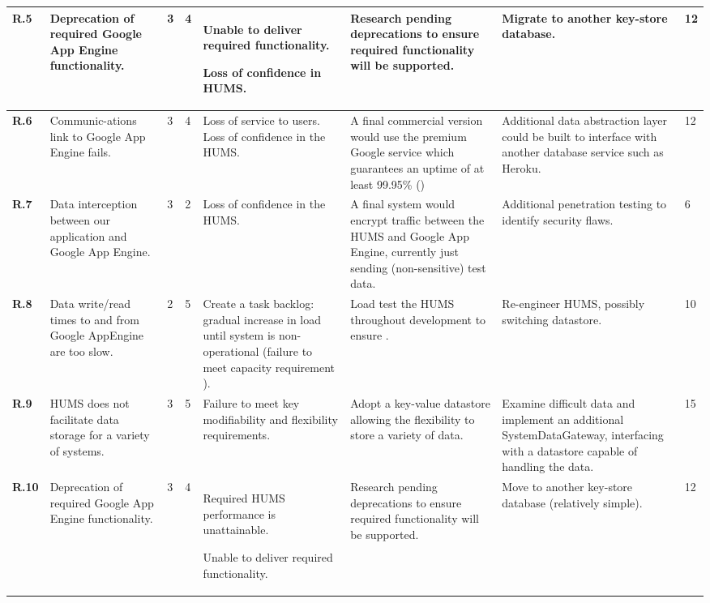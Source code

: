 \begin{longtable}[H]{| p{0.6cm} | p{2.2cm} | p{0.26cm} | p{0.26cm} | p{2.7cm} | p{3cm} | p{2.6cm} | p{0.4cm} |}
  \hline \textbf{R.5}
  & Deprecation of required Google App Engine functionality.
  & 3
  & 4

  & Unable to deliver required functionality.
  
  Loss of confidence in HUMS.
  & Research pending deprecations to ensure required functionality will be supported.
  & Migrate to another key-store database.
  & 12\\
  
  \hline \textbf{R.6}
  & Communic-ations link to Google App Engine fails.
  & 3
  & 4
  & Loss of service to users.
  Loss of confidence in the HUMS.
  & A final commercial version would use the premium Google service which guarantees an uptime of at least 99.95\% (\nfrit10)
  & Additional data abstraction layer could be built to interface with another database service such as Heroku.
  & 12\\
  
  \hline \textbf{R.7}
  & Data interception between our application and Google App Engine.
  & 3
  & 2
  & Loss of confidence in the HUMS.
  & A final system would encrypt traffic between the HUMS and Google App Engine, currently just sending (non-sensitive) test data.
  & Additional penetration testing to identify security flaws.
  & 6\\
  
  \hline \textbf{R.8}
  & Data write/read times to and from Google AppEngine are too slow.
  & 2
  & 5
  & Create a task backlog: gradual increase in load until system
  is non-operational (failure to meet capacity requirement \nfrit9).
  & Load test the HUMS throughout development to ensure \nfrit9.
  & Re-engineer HUMS, possibly switching datastore.
  & 10\\
  
  \hline \textbf{R.9}
  & HUMS does not facilitate data storage for a variety of systems.
  & 3
  & 5
  & Failure to meet key modifiability and flexibility requirements.
  & Adopt a key-value datastore allowing the flexibility to store a variety of data.
  & Examine difficult data and implement an additional SystemDataGateway,
  interfacing with a datastore capable of handling the data.
  & 15\\  
  
  \hline \textbf{R.10}
  & Deprecation of required Google App Engine functionality.
  & 3
  & 4
  & Required HUMS performance is unattainable.
  
  Unable to deliver required functionality.
  & Research pending deprecations to ensure required functionality will be supported.
  & Move to another key-store database (relatively simple).
  & 12\\
  

\end{longtable}
